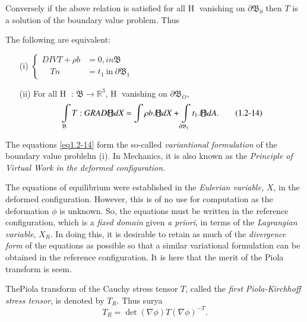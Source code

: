 Conversely if the above relation is satisfied for all \textcircled{H}
vanishing on $\partial \mathfrak{B}_0$ then $T$ is a solution of the
boundary value problem. Thus  

\begin{theorem}\label{chap1-thm1.2.2}%
The following are equivalent:

\begin{itemize}
\item[\rm(i)] 
    $\begin{cases}
      DIV  T + \rho b &= 0, in \mathfrak{B}\\
      \quad Tn & = t_1  ~\text{in}~ \partial \mathfrak{B}_1
    \end{cases}$

\item[\rm (ii)] For all \textcircled{H} : $\mathfrak{B} \rightarrow
  \mathbb{R}^3$, \textcircled{H} vanishing on $\partial
  \mathfrak{B}_O$, 
  \begin{equation*}
    \int\limits_{\mathfrak{B}} T : GRAD \text{\textcircled{H}}dX = \int
    \rho b.\text{\textcircled{H}}dX + \int\limits_{\partial
      \mathfrak{B}_1} t_1.{\text{\textcircled{H}}}dA.\tag{1.2-14}\label{eq1.2-14} 
  \end{equation*}
\end{itemize}%
\end{theorem}

The equations \eqref{eq1.2-14} form the so-called \textit{variantional
  formulation} of the boundary value problelm (i). In Mechanics, it
is also known as the \textit{Principle of Virtual Work in the deformed
  configuration.} 

The equations of equilibrium were established in the \textit{Eulerian
  variable,} $X$, in the deformed configuration. However, this is of
no use for computation as the deformation $\phi$ is unknown. So, the
equations must be written in the reference configuration, which is a
\textit{fixed domain} given \textit{a priori}, in terms of the
\textit{Lagrangian variable}, $X_R$. In doing this, it is desirable to
retain as much of the \textit{divergence form} of the equations as
possible so that a similar variational formulation can be obtained in
the reference configuration. It is here that the merit of the Piola
transform is seem. 

The\pageoriginale  Piola transform of the Cauchy stress tensor $T$, called the
\textit{first Piola-Kirchhoff stress tensor},  is denoted by 
$T_R$. Thus surya 
$$
T_R = \det (\nabla  \phi) T(\nabla  \phi)^{-T}.
$$

